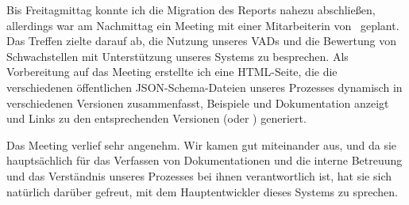 
Bis Freitagmittag konnte ich die Migration des Reports nahezu abschließen, allerdings war am Nachmittag ein Meeting mit einer Mitarbeiterin von \aeclientZEZESE\ geplant.
Das Treffen zielte darauf ab, die Nutzung unseres VADs und die Bewertung von Schwachstellen mit Unterstützung unseres Systems zu besprechen.
Als Vorbereitung auf das Meeting erstellte ich eine HTML-Seite, die die verschiedenen öffentlichen JSON-Schema-Dateien unseres Prozesses dynamisch in verschiedenen Versionen zusammenfasst, Beispiele und Dokumentation anzeigt und Links zu den entsprechenden Versionen (oder ) generiert.

Das Meeting verlief sehr angenehm.
Wir kamen gut miteinander aus, und da sie hauptsächlich für das Verfassen von Dokumentationen und die interne Betreuung und das Verständnis unseres Prozesses bei ihnen verantwortlich ist, hat sie sich natürlich darüber gefreut, mit dem Hauptentwickler dieses Systems zu sprechen.
